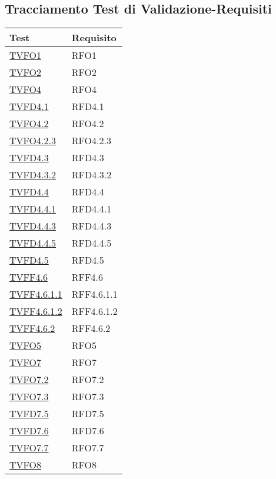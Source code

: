 \subsection{Tracciamento Test di Validazione-Requisiti}
\normalsize
\begin{longtable}{|>{\centering}m{5cm}|m{5cm}<{\centering}|}
\hline 
\textbf{Test} & \textbf{Requisito}\\
\hline
\endhead
\hyperlink{TVFO1}{TVFO1} & RFO1\\ \hline
\hyperlink{TVFO2}{TVFO2} & RFO2\\ \hline
\hyperlink{TVFO4}{TVFO4} & RFO4\\ \hline
\hyperlink{TVFD4.1}{TVFD4.1} & RFD4.1\\ \hline
\hyperlink{TVFO4.2}{TVFO4.2} & RFO4.2\\ \hline
\hyperlink{TVFO4.2.3}{TVFO4.2.3} & RFO4.2.3\\ \hline
\hyperlink{TVFD4.3}{TVFD4.3} & RFD4.3\\ \hline
\hyperlink{TVFD4.3.2}{TVFD4.3.2} & RFD4.3.2\\ \hline
\hyperlink{TVFD4.4}{TVFD4.4} & RFD4.4\\ \hline
\hyperlink{TVFD4.4.1}{TVFD4.4.1} & RFD4.4.1\\ \hline
\hyperlink{TVFD4.4.3}{TVFD4.4.3} & RFD4.4.3\\ \hline
\hyperlink{TVFD4.4.5}{TVFD4.4.5} & RFD4.4.5\\ \hline
\hyperlink{TVFD4.5}{TVFD4.5} & RFD4.5\\ \hline
\hyperlink{TVFF4.6}{TVFF4.6} & RFF4.6\\ \hline
\hyperlink{TVFF4.6.1.1}{TVFF4.6.1.1} & RFF4.6.1.1\\ \hline
\hyperlink{TVFF4.6.1.2}{TVFF4.6.1.2} & RFF4.6.1.2\\ \hline
\hyperlink{TVFF4.6.2}{TVFF4.6.2} & RFF4.6.2\\ \hline
\hyperlink{TVFO5}{TVFO5} & RFO5\\ \hline
\hyperlink{TVFO7}{TVFO7} & RFO7\\ \hline
\hyperlink{TVFO7.2}{TVFO7.2} & RFO7.2\\ \hline
\hyperlink{TVFO7.3}{TVFO7.3} & RFO7.3\\ \hline
\hyperlink{TVFD7.5}{TVFD7.5} & RFD7.5\\ \hline
\hyperlink{TVFD7.6}{TVFD7.6} & RFD7.6\\ \hline
\hyperlink{TVFO7.7}{TVFO7.7} & RFO7.7\\ \hline
\hyperlink{TVFO8}{TVFO8} & RFO8\\ \hline

\end{longtable}
